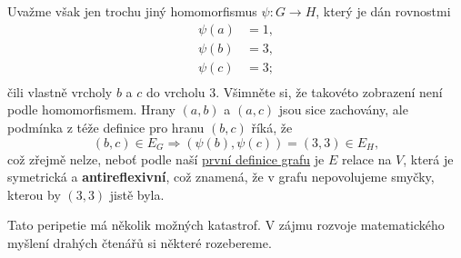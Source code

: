 Uvažme však jen trochu jiný homomorfismus $\psi: G \to H$, který je dán
rovnostmi
\begin{equation*}
 \begin{split}
  \psi(a) &= 1, \\
  \psi(b) &= 3, \\
  \psi(c) &= 3; \\
 \end{split}
\end{equation*}
čili vlastně  vrcholy $b$ a $c$ do vrcholu $3$. Všimněte si, že
takovéto zobrazení není podle 
homomorfismem. Hrany $(a,b)$ a $(a,c)$ jsou sice zachovány, ale podmínka z téže
definice pro hranu $(b,c)$ říká, že
\[
 (b,c) \in E_G \Rightarrow (\psi(b),\psi(c)) = (3,3) \in E_H,
\]
což zřejmě nelze, neboť podle naší \hyperref[def:graf-poprve]{první definice
grafu} je $E$ relace na $V$, která je symetrická a \textbf{antireflexivní}, což
znamená, že v grafu nepovolujeme smyčky, kterou by $(3,3)$ jistě byla.

Tato peripetie má několik možných katastrof. V zájmu rozvoje matematického
myšlení drahých čtenářů si některé rozebereme.

